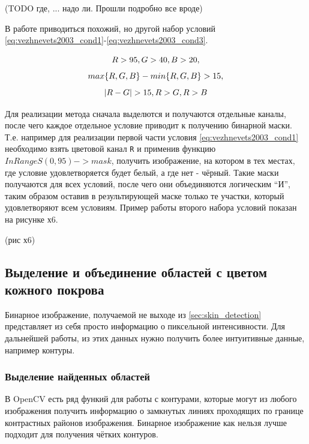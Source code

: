 \documentclass[12pt]{report}
\begin{document}
(TODO где, ... надо ли. Прошли подробно все вроде)

В работе \citep{vezhnevets2003survey} приводиться похожий, но другой набор условий \ref{eq:vezhnevets2003_cond1}-\ref{eq:vezhnevets2003_cond3}.

\begin{equation}
\label{eq:vezhnevets2003_cond1}
\centering
R>95, G>40, B>20,
\end{equation}
\begin{equation}
\label{eq:vezhnevets2003_cond2}
\centering
max\{R,G,B\} - min\{R,G,B\} > 15,
\end{equation}
\begin{equation}
\label{eq:vezhnevets2003_cond3}
\centering
|R - G| > 15, R > G, R > B
\end{equation}

Для реализации метода сначала выделются и получаются отдельные каналы, после чего каждое отдельное условие приводит к получению бинарной маски. Т.е. например для реализации первой части условия \ref{eq:vezhnevets2003_cond1} необходимо взять цветовой канал \texttt{R} и применив функцию $InRangeS(0, 95) -> mask$, получить изображение, на котором в тех местах, где условие удовлетворяется будет белый, а где нет - чёрный. Такие маски получаются для всех условий, после чего они объединяются логическим ``И'', таким образом оставив в результирующей маске только те участки, который удовлетворяют всем условиям. Пример работы второго набора условий показан на рисунке х6.

(рис х6)

\subsection{Выделение и объединение областей с цветом кожного покрова}

Бинарное изображение, получаемой не выходе из \ref{sec:skin_detection} представляет из себя просто информацию о пиксельной интенсивности. Для дальнейшей работы, из этих данных нужно получить более интуитивные данные, например контуры. 
\subsubsection{Выделение найденных областей}
В OpenCV есть ряд функий для работы с контурами, которые могут из любого изображения получить информацию о замкнутых линиях проходящих по границе контрастных районов изображения. Бинарное изображение как нельзя лучше подходит для получения чётких контуров.
\end{document}
